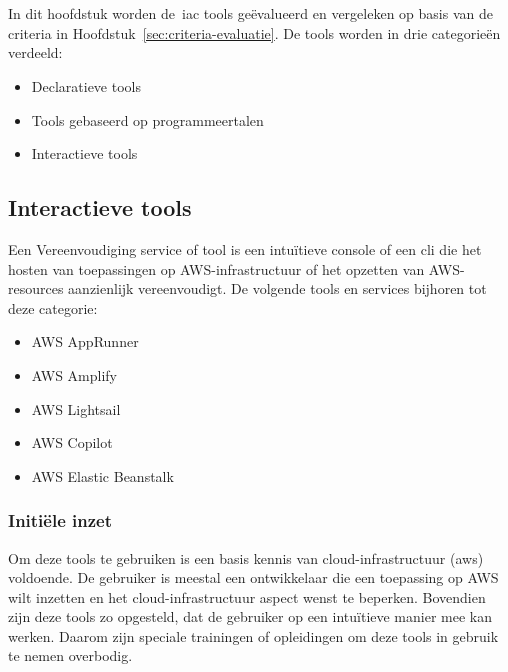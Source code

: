 
\chapter{}
\label{ch:vergelijking}

In dit hoofdstuk worden de~\acrshort{iac} tools geëvalueerd en vergeleken op basis van de criteria in Hoofdstuk~\ref{sec:criteria-evaluatie}.
De tools worden in drie categorieën verdeeld:

\begin{itemize}
    \item Declaratieve tools
    \item Tools gebaseerd op programmeertalen
    \item Interactieve tools
\end{itemize}



\section{Interactieve tools}
\label{sec:interactieve-tools}

Een Vereenvoudiging service of tool is een intuïtieve console of een \acrshort{cli} die het hosten van toepassingen op AWS-infrastructuur of het opzetten van AWS-resources aanzienlijk vereenvoudigt.
De volgende tools en services bijhoren tot deze categorie:

\begin{itemize}
    \item AWS AppRunner
    \item AWS Amplify
    \item AWS Lightsail
    \item AWS Copilot
    \item AWS Elastic Beanstalk
\end{itemize}

\subsection{Initiële inzet}
\label{subsec:initiële-inzet-ver}

Om deze tools te gebruiken is een basis kennis van cloud-infrastructuur (\acrshort{aws}) voldoende.
De gebruiker is meestal een ontwikkelaar die een toepassing op AWS wilt inzetten en het cloud-infrastructuur aspect wenst te beperken.
Bovendien zijn deze tools zo opgesteld, dat de gebruiker op een intuïtieve manier mee kan werken.
Daarom zijn speciale trainingen of opleidingen om deze tools in gebruik te nemen overbodig.

